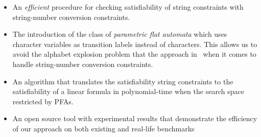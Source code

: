 \documentclass[sigplan,review,anonymous]{acmart}\settopmatter{printfolios=true,printccs=false,printacmref=false}
\begin{document}
\begin{itemize}

\item An {\em efficient} procedure for checking satisfiability
of string constraints with string-number conversion constraints.



\item The introduction of the class of \emph{parametric flat automata} which uses character variables as transition labels instead of characters. This allows us to avoid the {alphabet explosion problem} that the approach in~\cite{abdulla2017flatten} when it comes to handle string-number conversion constraints.


\item An algorithm that translates the satisfiability string constraints to the satisfiability of a linear formula  in polynomial-time when  the search space restricted by PFAs.


\item An open source tool with experimental
results that demonstrate the efficiency of
our approach on both existing and real-life benchmarks
\end{itemize}
\end{document}
